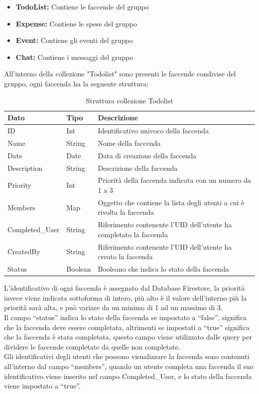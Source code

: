 \begin{itemize}
    \item \textbf{TodoList:} Contiene le faccende del gruppo
    \item \textbf{Expense:} Contiene le spese del gruppo
    \item \textbf{Event:} Contiene gli eventi del gruppo
    \item \textbf{Chat:} Contiene i messaggi del gruppo
\end{itemize}

\newpage

All'interno della collezione "Todolist" sono presenti le faccende condivise del gruppo, ogni faccenda ha la seguente struttura:
\begin{table}[!h]
\begin{center}
\begin{tabular}{|l|l|p{9cm}|}
    \hline
\textbf{Dato} & \textbf{Tipo}  & \textbf{Descrizione}\\ \hline
ID & Int & Identificativo univoco della faccenda \\ \hline
Name & String & Nome della faccenda \\ \hline
Date & Date & Data di creazione della faccenda \\ \hline
Description & String & Descrizione della faccenda \\ \hline
Priority & Int & Priorità della faccenda indicata con un numero da 1 a 3 \\ \hline
Members & Map & Oggetto che contiene la lista degli utenti a cui è rivolta la faccenda \\ \hline
Completed\_User & String & Riferimento contenente l'UID dell'utente ha completato la faccenda\\ \hline
CreatedBy & String & Riferimento contenente l'UID dell'utente ha creato la faccenda \\ \hline
Status & Boolean & Booleano che indica lo stato della faccenda\\
\hline
\end{tabular}
\caption[Collezione Todolist]{Struttura collezione Todolist}\label{tab:Strutture collezione Todolist}
\end{center}
\end{table}

L'identificativo di ogni faccenda è assegnato dal Database Firestore, la priorità invece viene indicata sottoforma di intero, più alto è il valore dell'interno più la priorità sarà alta, e può variare da un minimo di 1 ad un massimo di 3.\\
Il campo ``status'' indica lo stato della faccenda se impostato a ``false'', significa che la faccenda deve essere completata, altrimenti se impostati a ``true'' significa che la faccenda è stata completata, questo campo viene utilizzato dalle query per dividere le faccende completate da quelle non completate.\\
Gli identificativi degli utenti che possono visualizzare la faccenda sono contenuti all'interno dal campo ``members'', quando un utente completa una faccenda il suo identificativo viene inserito nel campo Completed\_User, e lo stato della faccenda viene impostato a ``true''.

